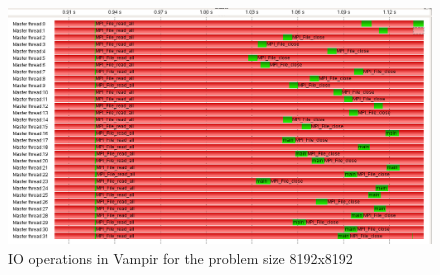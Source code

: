 \begin{enumerate}
 \begin{figure}[p] %
   \begin{center}
     \includegraphics[width=.9\linewidth]{Figures/io/io_vampir_biggest_size.png} %
     \caption{IO operations in Vampir for the problem size 8192x8192}
     \label{fig:par_io_vampir}
   \end{center}
 \end{figure} 
 
\end{enumerate}

